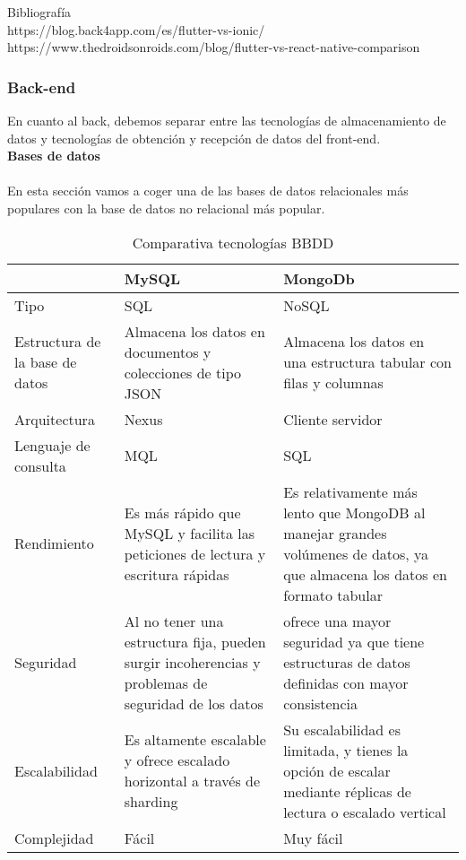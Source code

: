 Bibliografía \\

https://blog.back4app.com/es/flutter-vs-ionic/ \\
https://www.thedroidsonroids.com/blog/flutter-vs-react-native-comparison

\subsubsection{Back-end}

En cuanto al back, debemos separar entre las tecnologías de almacenamiento de datos y tecnologías de obtención y recepción de datos del front-end. \\

\textbf{Bases de datos} \\ \\
En esta sección vamos a coger una de las bases de datos relacionales más populares con la base de datos no relacional más popular. 
\begin{table}[H] %
    \centering
    \begin{tabular}{|p{2cm} |p{4 cm} |p{4cm} |} \hline 
         &  \textbf{MySQL}&  \textbf{MongoDb}\\  \hline 
         Tipo &  SQL &  NoSQL \\ \hline 
         
        Estructura de la base de datos &  Almacena los datos en documentos y colecciones de tipo JSON &  Almacena los datos en una estructura tabular con filas y columnas \\ \hline 
        Arquitectura &  Nexus &  Cliente servidor\\ \hline 
        Lenguaje de consulta &  MQL &  SQL\\ \hline 
        Rendimiento &  Es más rápido que MySQL y facilita las peticiones de lectura y escritura rápidas &  	Es relativamente más lento que MongoDB al manejar grandes volúmenes de datos, ya que almacena los datos en formato tabular \\ \hline 
        Seguridad &  Al no tener una estructura fija, pueden surgir incoherencias y problemas de seguridad de los datos &  ofrece una mayor seguridad ya que tiene estructuras de datos definidas con mayor consistencia \\ \hline
        Escalabilidad &  Es altamente escalable y ofrece escalado horizontal a través de sharding &  Su escalabilidad es limitada, y tienes la opción de escalar mediante réplicas de lectura o escalado vertical \\ \hline
        Complejidad &  Fácil &  Muy fácil \\ \hline
        
    \end{tabular}
    \caption{Comparativa tecnologías BBDD}
    \label{tab:tec_db}
\end{table}

